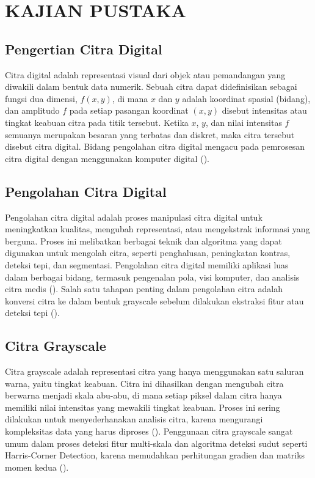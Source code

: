 
\chapter{KAJIAN PUSTAKA}

\section{Pengertian Citra Digital}
  Citra digital adalah representasi visual dari objek atau pemandangan yang diwakili dalam bentuk data numerik.
Sebuah citra dapat didefinisikan sebagai fungsi dua dimensi, \(f(x, y)\), di mana \(x\) dan \(y\) adalah koordinat spasial (bidang), dan amplitudo \(f\) pada setiap pasangan koordinat \((x, y)\) disebut intensitas atau tingkat keabuan citra pada titik tersebut. Ketika \(x\), \(y\), dan nilai intensitas \(f\) semuanya merupakan besaran yang terbatas dan diskret, maka citra tersebut disebut citra digital. Bidang pengolahan citra digital mengacu pada pemrosesan citra digital dengan menggunakan komputer digital (\cite[hlm. 1--6]{Gonzalez2018}).

\section{Pengolahan Citra Digital}
  Pengolahan citra digital adalah proses manipulasi citra digital untuk meningkatkan kualitas, mengubah representasi, atau mengekstrak informasi yang berguna. Proses ini melibatkan berbagai teknik dan algoritma yang dapat digunakan untuk mengolah citra, seperti penghalusan, peningkatan kontras, deteksi tepi, dan segmentasi. Pengolahan citra digital memiliki aplikasi luas dalam berbagai bidang, termasuk pengenalan pola, visi komputer, dan analisis citra medis (\cite[hlm. 27--32]{Gonzalez2018}). 
  Salah satu tahapan penting dalam pengolahan citra adalah konversi citra ke dalam bentuk grayscale sebelum dilakukan ekstraksi fitur atau deteksi tepi (\cite[hlm. 307--308]{Sanchez2018}).

\section{Citra Grayscale}
  Citra grayscale adalah representasi citra yang hanya menggunakan satu saluran warna, yaitu tingkat keabuan. Citra ini dihasilkan dengan mengubah citra berwarna menjadi skala abu-abu, di mana setiap piksel dalam citra hanya memiliki nilai intensitas yang mewakili tingkat keabuan. Proses ini sering dilakukan untuk menyederhanakan analisis citra, karena mengurangi kompleksitas data yang harus diproses (\cite[hlm. 27--32]{Gonzalez2018}). 
  Penggunaan citra grayscale sangat umum dalam proses deteksi fitur multi-skala dan algoritma deteksi sudut seperti Harris-Corner Detection, karena memudahkan perhitungan gradien dan matriks momen kedua (\cite[hlm. 307--308]{Sanchez2018}).

